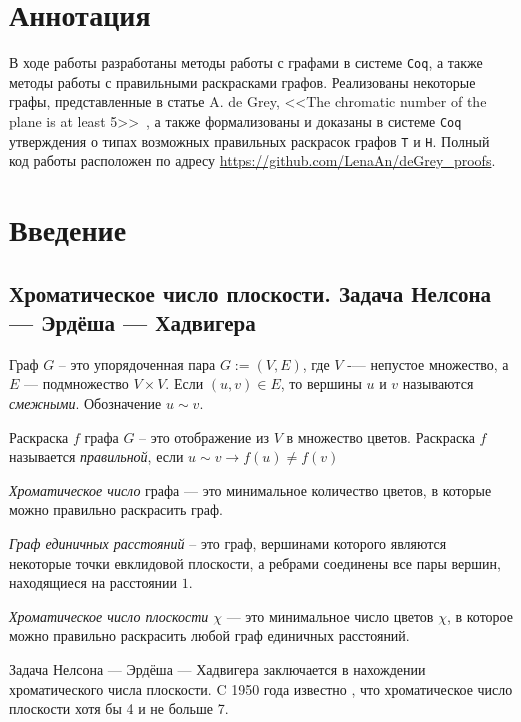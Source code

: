 \chapter*{Аннотация}		%

В ходе работы разработаны методы работы с графами в системе {\tt Coq}, а также методы работы с правильными раскрасками графов. Реализованы некоторые графы, представленные в статье A. de Grey, <<The chromatic number of the plane is at least 5>>~\cite{deGrey}, а также формализованы и доказаны в системе {\tt Coq} утверждения о типах возможных правильных раскрасок графов
{\tt T} и {\tt H}. Полный код работы расположен по адресу \href{https://github.com/LenaAn/deGrey_proofs}{https://github.com/LenaAn/deGrey\_proofs}.

\chapter*{Введение}		%

\section{Хроматическое число плоскости. Задача Нелсона — Эрдёша — Хадвигера}

Граф $G$ -- это упорядоченная пара $G := (V, E)$, где $V$ -— непустое множество, а $E$ — подмножество $V\times V$. Если $(u, v) \in E$, то вершины $u$ и $v$ называются { \it смежными}. Обозначение $u \sim v$.

Раскраска $f$ графа $G$ -- это отображение из $V$ в множество цветов. 
Раскраска $f$ называется {\it правильной}, если $u \sim v \rightarrow f(u) \neq  f(v)$

{\it Хроматическое число} графа --- это минимальное количество цветов, в которые можно правильно раскрасить граф.

{\it Граф единичных расстояний} -- это граф, вершинами которого являются некоторые точки евклидовой плоскости, а ребрами соединены все пары вершин,  находящиеся на расстоянии $1$.

{\it Хроматическое число плоскости $\chi$ } --- это минимальное число цветов $\chi$, в которое можно правильно раскрасить любой граф единичных расстояний.

Задача Нелсона — Эрдёша — Хадвигера заключается в нахождении хроматического числа плоскости. C 1950 года известно \cite{Soi}, что хроматическое число плоскости хотя бы 4 и не больше 7. 

